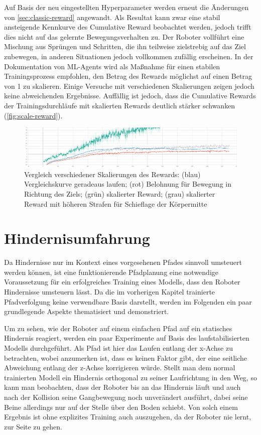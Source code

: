 Auf Basis der neu eingestellten Hyperparameter werden erneut die Änderungen von \autoref{sec:classic-reward} angewandt.
Als Resultat kann zwar eine stabil ansteigende Kennkurve des Cumulative Reward beobachtet werden, jedoch trifft dies nicht auf das gelernte Bewegungsverhalten zu.
Der Roboter vollführt eine Mischung aus Sprüngen und Schritten, die ihn teilweise zielstrebig auf das Ziel zubewegen, in anderen Situationen jedoch vollkommen zufällig erscheinen.
In der Dokumentation von ML-Agents wird als Maßnahme für einen stabilen Trainingsprozess empfohlen, den Betrag des Rewards möglichst auf einen Betrag von 1 zu skalieren.
Einige Versuche mit verschiedenen Skalierungen zeigen jedoch keine abweichenden Ergebnisse.
Auffällig ist jedoch, dass die Cumulative Rewards der Trainingsdurchläufe mit skalierten Rewards deutlich stärker schwanken (\autoref{fig:scale-reward}).

\begin{figure}
    \centering
    \includegraphics[width = \textwidth]{Bilder/ml-agents/Environment_Cumulative Reward-scale-reward.pdf}
    \caption[Vergleich verschiedener Skalierungen des Rewards]{Vergleich verschiedener Skalierungen des Rewards: (blau) Vergleichskurve geradeaus laufen; (rot) Belohnung für Bewegung in Richtung des Ziels; (grün) skalierter Reward; (grau) skalierter Reward mit höheren Strafen für Schieflage der Körpermitte}
    \label{fig:scale-reward}
\end{figure}

\section{Hindernisumfahrung}
Da Hindernisse nur im Kontext eines vorgesehenen Pfades sinnvoll umsteuert werden können, ist eine funktionierende Pfadplanung eine notwendige Voraussetzung für ein erfolgreiches Training eines Modells, dass den Roboter Hindernisse umsteuern lässt.
Da die im vorherigen Kapitel trainierte Pfadverfolgung keine verwendbare Basis darstellt, werden im Folgenden ein paar grundlegende Aspekte thematisiert und demonstriert.

Um zu sehen, wie der Roboter auf einem einfachen Pfad auf ein statisches Hindernis reagiert, werden ein paar Experimente auf Basis des laufstabilisierten Modells durchgeführt.
Als Pfad ist hier das Laufen entlang der x-Achse zu betrachten, wobei anzumerken ist, dass es keinen Faktor gibt, der eine seitliche Abweichung entlang der z-Achse korrigieren würde.
Stellt man dem normal trainierten Modell ein Hindernis orthogonal zu seiner Laufrichtung in den Weg, so kann man beobachten, dass der Roboter bis an das Hindernis läuft und auch nach der Kollision seine Gangbewegung noch unverändert ausführt, dabei seine Beine allerdings nur auf der Stelle über den Boden schiebt.
Von solch einem Ergebnis ist ohne explizites Training auch auszugehen, da der Roboter nie lernt, zur Seite zu gehen.

